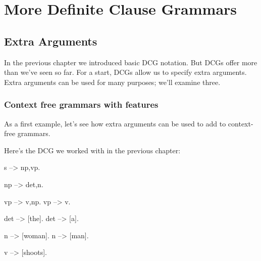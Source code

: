

\chapter{More Definite Clause Grammars}\label{CHAPTER8}





\section{Extra Arguments}\label{SEC.L8.EXTRA.ARGUMENTS}

In the previous chapter we introduced basic DCG notation. But DCGs
offer  more than we've seen so far.  For a start, DCGs allow us to
specify extra arguments.  Extra arguments can be used for many
purposes; we'll examine three.




\subsection*{Context free grammars with features}\label{SUBSEC.L8.GRAMMARS.FEATURES}


As a first example, let's see how extra arguments can be used to add
 to context-free grammars.

Here's the  DCG we worked with in the previous chapter:

\begin{LPNcodedisplay}
s --> np,vp.

np --> det,n.

vp --> v,np.
vp --> v.

det --> [the].
det --> [a].

n --> [woman].
n --> [man].

v --> [shoots].
\end{LPNcodedisplay}

